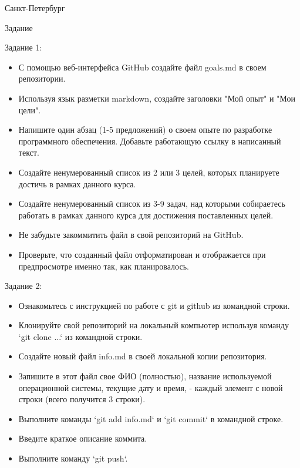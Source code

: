 \documentclass[12pt]{article}
\begin{document}


\vspace{\baselineskip}
\vspace{\baselineskip}
\vspace{\baselineskip}
\vspace{\baselineskip}
\vspace{\baselineskip}
\begin{Center}
Санкт-Петербург \the\year{}
\end{Center}
\pagebreak[4]
\begin{Center}
Задание
\end{Center}
Задание 1:
\begin{itemize}
\item С помощью веб-интерфейса GitHub создайте файл goals.md в своем репозитории.
\item Используя язык разметки markdown, создайте заголовки "Мой опыт" и "Мои цели".
\item Напишите один абзац (1-5 предложений) о своем опыте по разработке программного обеспечения. Добавьте работающую ссылку в написанный текст.
\item Создайте ненумерованный список из 2 или 3 целей, которых планируете достичь в рамках данного курса. 
\item Создайте ненумерованный список из 3-9 задач, над которыми собираетесь работать в рамках данного курса для достижения поставленных целей.
\item Не забудьте закоммитить файл в свой репозиторий на GitHub.
\item Проверьте, что созданный файл отформатирован и отображается при предпросмотре именно так, как планировалось.
\end{itemize}
Задание 2:
\begin{itemize}
\item Ознакомьтесь с инструкцией по работе с git и github из командной строки. 
\item Клонируйте свой репозиторий на локальный компьютер используя команду `git clone ...` из командной строки.
\item Создайте новый файл info.md в своей локальной копии репозитория.
\item Запишите в этот файл свое ФИО (полностью), название используемой операционной системы, текущие дату и время, - каждый элемент с новой строки (всего получится 3 строки).
\item Выполните команды `git add info.md` и `git commit` в командной строке.
\item Введите краткое описание коммита.
\item Выполните команду `git push`.
\end{itemize}
\end{document}
